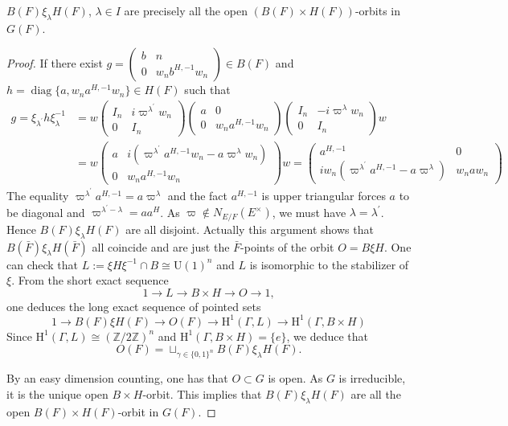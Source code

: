 \documentclass[10pt,a4paper]{amsart}
\DeclareMathOperator{\diag}{diag}
\newcommand{\BZ}{{\mathbb {Z}}}
\newcommand{\U}{\mathrm{U}}
\newcommand{\h}{\mathrm{H}}
\begin{document}
\begin{prop}   $B(F)\xi_\lambda H(F)$, $\lambda\in I$ are precisely all the open $(B(F)\times H(F))$-orbits in $G(F)$.  \end{prop}

\begin{proof} If there exist $g=\begin{pmatrix} b & n \\ 0 & w_n b^{H,-1} w_n\end{pmatrix}\in B(F)$ and $h=\diag\{a, w_n a^{H,-1}w_n\}\in H(F)$ such that \begin{align*}
 g=\xi_{\lambda^\prime}h\xi_\lambda^{-1}&=w \begin{pmatrix} I_n & i \varpi^{\lambda^\prime}w_n \\ 0 & I_n\end{pmatrix} \begin{pmatrix}a & 0 \\ 0 & w_n a^{H,-1}w_n\end{pmatrix} \begin{pmatrix} I_n & -i \varpi^{\lambda}w_n \\ 0 & I_n\end{pmatrix}w\\   
 &=w\begin{pmatrix} a & i (\varpi^{\lambda^\prime}a^{H,-1}w_n-a\varpi^{\lambda}w_n)\\ 0 & w_n a^{H,-1}w_n\end{pmatrix}w=\begin{pmatrix} a^{H,-1} & 0\\ i w_n(\varpi^{\lambda^\prime}a^{H,-1}-a\varpi^{\lambda}) & w_n aw_n\end{pmatrix}
\end{align*}
The equality $\varpi^{\lambda^\prime}a^{H,-1}=a\varpi^\lambda$ and the fact $a^{H,-1}$ is upper triangular forces $a$ to be diagonal and $\varpi^{\lambda^{\prime}-\lambda}=aa^H$. As $\varpi\notin N_{E/F}(E^\times)$, we must have $\lambda=\lambda^\prime$. Hence $B(F)\xi_\lambda H(F)$ are all disjoint. Actually this argument shows that $B(\bar{F})\xi_\lambda H(\bar{F})$ all coincide and are just the $\bar{F}$-points of the orbit $O=B \xi H$. One can check that $L:=\xi H\xi^{-1}\cap B\cong \U(1)^n$ and $L$ is isomorphic to the stabilizer of $\xi$. 
From the short exact sequence 
\[1\to L\to B\times H\to O\to1,\]
one deduces the long exact sequence of pointed sets 
\[1\to B(F)\xi H(F)\to O(F)\to \h^1(\Gamma, L)\to \h^1(\Gamma, B\times H)\]
Since $\h^1(\Gamma, L)\cong (\BZ/2\BZ)^n$ and $\h^1(\Gamma, B\times H)=\{e\}$, we deduce that 
\[O(F)=\sqcup_{\gamma\in \{0,1\}^n}B(F)\xi_\lambda H(F).\]


 By an easy dimension counting, one has that $O\subset G$ is open. As $G$ is irreducible, it is the unique open $B\times H$-orbit. This implies that $B(F)\xi_\lambda H(F)$ are all the open $B(F)\times H(F)$-orbit in $G(F)$.
\end{proof}
\end{document}
